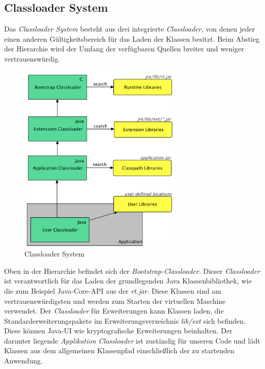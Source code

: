   \subsection{Classloader System}
    Das \textit{Classloader System} besteht aus drei integrierte \textit{Classloader}, von denen jeder einen anderen Gültigkeitsbereich für das Laden der Klassen besitzt. Beim Abstieg der Hierarchie wird der Umfang der verfügbaren Quellen breiter und weniger vertrauenswürdig. 
    \begin{figure}[h!]
      \centering
      \includegraphics[width=0.7\textwidth]{material/images/Classloader.png}
      \caption{Classloader System}
      \label{fig:Classloader}
    \end{figure}
    \newline Oben in der Hierarchie befindet sich der \textit{Bootstrap-Classloader}. 
    Dieser \textit{Classloader} ist verantwortlich für das Laden der grundlegenden Java Klassenbibliothek, wie die zum Beispiel Java-Core-API aus der \textit{rt.jar}. 
    Diese Klassen sind am vertrauenswürdigsten und werden zum Starten der virtuellen Maschine verwendet. 
    Der \textit{Classloader} für Erweiterungen kann Klassen laden, die Standarderweiterungspakete im Erweiterungsverzeichnis \textit{lib/ext} sich befinden. 
    Diese können Java-UI wie kryptografische Erweiterungen beinhalten. 
    Der darunter liegende \textit{Applikation Classloader} ist zuständig für unseren Code und lädt Klassen aus dem allgemeinen Klassenpfad einschließlich der zu startenden Anwendung. 
